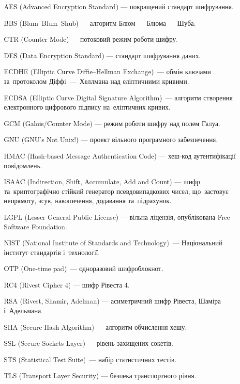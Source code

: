 \documentclass[a4paper,oneside,titlepage,14pt]{extarticle}
\begin{document}
		AES (Advanced Encryption Standard) --- покращений стандарт шифрування.\par
		BBS (Blum--Blum--Shub) --- алгоритм Блюм --- Блюма --- Шуба.\par
		CTR (Counter Mode) --- потоковий режим роботи шифру.\par		
		DES (Data Encryption Standard) --- стандарт шифрування даних.\par
		ECDHE (Elliptic Curve Diffie--Hellman Exchange)~--- обмін ключами за~протоколом Діффі~---~Хеллмана над еліптичними кривими.\par
		ECDSA (Elliptic Curve Digital Signature Algorithm)~--- алгоритм створення електронного цифрового підпису на~еліптичних кривих.\par
		GCM (Galois/Counter Mode) --- режим роботи шифру над полем Галуа.\par
		GNU (GNU's Not Unix!) --- проект вільного програмного забезпечення.\par
		HMAC (Hash-based Message Authentication Code) --- хеш-код аутентифікації повідомлень.\par
		ISAAC (Indirection, Shift, Accumulate, Add and Count) --- шифр та~криптографічно стійкий генератор псевдовипадкових чисел, що~застовує непрямоту, зсув, накопичення, додавання та~підрахунок.\par
		LGPL (Lesser General Public License) --- вільна ліцензія, опублікована Free Software Foundation.\par
		NIST (National Institute of Standards and Technology)~--- Національний інститут стандартів і~технології.\par
		OTP (One-time pad)~--- одноразовий шифроблокнот.\par
		RC4 (Rivest Cipher 4) --- шифр Рівеста 4.\par
		RSA (Rivest, Shamir, Adelman) --- асиметричний шифр Рівеста, Шаміра і~Адельмана.\par
		SHA (Secure Hash Algorithm) --- алгоритм обчислення хешу.\par
		SSL (Secure Sockets Layer) --- рівень захищених сокетів.\par
		STS (Statistical Test Suite)~--- набір статистичних тестів.\par
		TLS (Transport Layer Security) --- безпека транспортного рівня.\par		
	
	\newpage
	
	\tableofcontents
	
	\newpage
	
\end{document}
